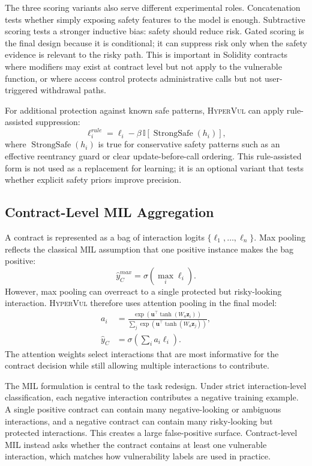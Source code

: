 \documentclass[conference]{IEEEtran}
\newcommand{\tool}{\textsc{HyperVul}}
\begin{document}
The three scoring variants also serve different experimental roles. Concatenation tests whether simply exposing safety features to the model is enough. Subtractive scoring tests a stronger inductive bias: safety should reduce risk. Gated scoring is the final design because it is conditional; it can suppress risk only when the safety evidence is relevant to the risky path. This is important in Solidity contracts where modifiers may exist at contract level but not apply to the vulnerable function, or where access control protects administrative calls but not user-triggered withdrawal paths.

For additional protection against known safe patterns, \tool{} can apply rule-assisted suppression:
\begin{equation}
\ell_i^{rule}=\ell_i-\beta\,\mathbb{I}[\operatorname{StrongSafe}(h_i)],
\end{equation}
where $\operatorname{StrongSafe}(h_i)$ is true for conservative safety patterns such as an effective reentrancy guard or clear update-before-call ordering. This rule-assisted form is not used as a replacement for learning; it is an optional variant that tests whether explicit safety priors improve precision.

\subsection{Contract-Level MIL Aggregation}

A contract is represented as a bag of interaction logits $\{\ell_1,\ldots,\ell_n\}$. Max pooling reflects the classical MIL assumption that one positive instance makes the bag positive:
\begin{equation}
\hat{y}_C^{max}=\sigma(\max_i \ell_i).
\end{equation}
However, max pooling can overreact to a single protected but risky-looking interaction. \tool{} therefore uses attention pooling in the final model:
\begin{align}
a_i&=\frac{\exp(\mathbf{u}^{\top}\tanh(W_a\mathbf{z}_i))}
{\sum_j \exp(\mathbf{u}^{\top}\tanh(W_a\mathbf{z}_j))},\\
\hat{y}_C&=\sigma\left(\sum_i a_i\ell_i\right).
\end{align}
The attention weights select interactions that are most informative for the contract decision while still allowing multiple interactions to contribute.

The MIL formulation is central to the task redesign. Under strict interaction-level classification, each negative interaction contributes a negative training example. A single positive contract can contain many negative-looking or ambiguous interactions, and a negative contract can contain many risky-looking but protected interactions. This creates a large false-positive surface. Contract-level MIL instead asks whether the contract contains at least one vulnerable interaction, which matches how vulnerability labels are used in practice.
\end{document}
